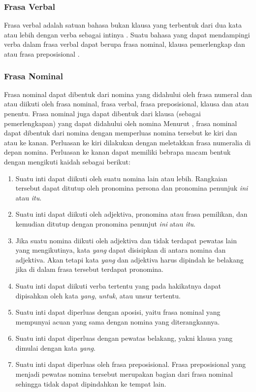 \subsubsection{Frasa Verbal}
Frasa verbal adalah satuan bahasa bukan klausa yang terbentuk dari dua kata atau lebih dengan verba sebagai intinya \citep{alwi}. Suatu bahasa yang dapat mendampingi verba dalam frasa verbal dapat berupa frasa nominal, klausa pemerlengkap dan atau frasa preposisional \citep{lapoliwa}.

\subsubsection{Frasa Nominal}
Frasa nominal dapat dibentuk dari nomina yang didahului oleh frasa numeral dan atau diikuti oleh frasa nominal, frasa verbal, frasa preposisional, klausa dan atau penentu. Frasa nominal juga dapat dibentuk dari klausa (sebagai pemerlengkapan) yang dapat didahului oleh nomina \citep{lapoliwa}
Menurut \citet{alwi}, frasa nominal dapat dibentuk dari nomina dengan memperluas nomina tersebut ke kiri dan atau ke kanan. Perluasan ke kiri dilakukan dengan meletakkan frasa numeralia di depan nomina. Perluasan ke kanan dapat memiliki bebrapa macam bentuk dengan mengikuti kaidah sebagai berikut:
\begin{enumerate}
	\item Suatu inti dapat diikuti oleh suatu nomina lain atau lebih. Rangkaian tersebut dapat ditutup oleh pronomina persona dan pronomina penunjuk \emph{ini} atau \emph{itu}.
	
	\item Suatu inti dapat diikuti oleh adjektiva, pronomina atau frasa pemilikan, dan kemudian ditutup dengan pronomina penunjut \emph{ini} atau \emph{itu}.
	
	\item Jika suatu nomina diikuti oleh adjektiva dan tidak terdapat pewatas lain yang mengikutinya, kata \emph{yang} dapat disisipkan di antara nomina dan adjektiva. Akan tetapi kata \emph{yang} dan adjektiva harus dipindah ke belakang jika di dalam frasa tersebut terdapat pronomina.

	\item Suatu inti dapat diikuti verba tertentu yang pada hakikatnya dapat dipisahkan oleh kata \emph{yang}, \emph{untuk}, atau unsur tertentu.

	\item Suatu inti dapat diperluas dengan aposisi, yaitu frasa nominal yang mempunyai acuan yang sama dengan nomina yang diterangkannya.

	\item Suatu inti dapat diperluas dengan pewatas belakang, yakni klausa yang dimulai dengan kata \emph{yang}.

	\item Suatu inti dapat diperluas oleh frasa preposisional. Frasa preposisional yang menjadi pewatas nomina tersebut merupakan bagian dari frasa nominal sehingga tidak dapat dipindahkan ke tempat lain. 
\end{enumerate}


